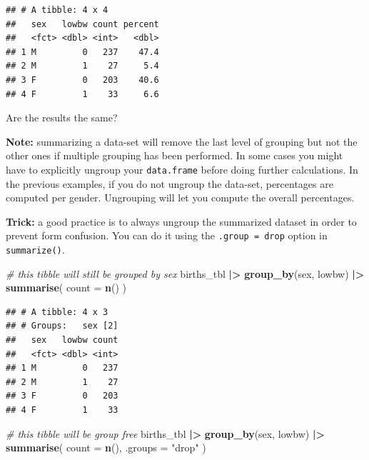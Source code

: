 \documentclass[
]{book}
\newenvironment{Shaded}{\begin{snugshade}}{\end{snugshade}}
\newcommand{\AttributeTok}[1]{\textcolor[rgb]{0.13,0.29,0.53}{#1}}
\newcommand{\CommentTok}[1]{\textcolor[rgb]{0.56,0.35,0.01}{\textit{#1}}}
\newcommand{\FunctionTok}[1]{\textcolor[rgb]{0.13,0.29,0.53}{\textbf{#1}}}
\newcommand{\NormalTok}[1]{#1}
\newcommand{\SpecialCharTok}[1]{\textcolor[rgb]{0.81,0.36,0.00}{\textbf{#1}}}
\newcommand{\StringTok}[1]{\textcolor[rgb]{0.31,0.60,0.02}{#1}}
\begin{document}
\begin{verbatim}
## # A tibble: 4 x 4
##   sex   lowbw count percent
##   <fct> <dbl> <int>   <dbl>
## 1 M         0   237    47.4
## 2 M         1    27     5.4
## 3 F         0   203    40.6
## 4 F         1    33     6.6
\end{verbatim}

Are the results the same?

\textbf{Note:} summarizing a data-set will remove the last level of grouping but not the other ones if multiple grouping has been performed. In some cases you might have to explicitly ungroup your \texttt{data.frame} before doing further calculations.
In the previous examples, if you do not ungroup the data-set, percentages are computed per gender. Ungrouping will let you compute the overall
percentages.

\textbf{Trick:} a good practice is to always ungroup the summarized dataset in order to prevent form confusion. You can do it using the \texttt{.group\ =\ \textquotesingle{}drop\textquotesingle{}} option in \texttt{summarize()}.

\begin{Shaded}
\begin{Highlighting}[]
\CommentTok{\# this tibble will still be grouped by sex}
\NormalTok{births\_tbl }\SpecialCharTok{|\textgreater{}}
  \FunctionTok{group\_by}\NormalTok{(sex, lowbw) }\SpecialCharTok{|\textgreater{}}
  \FunctionTok{summarise}\NormalTok{(}
    \AttributeTok{count =} \FunctionTok{n}\NormalTok{()}
\NormalTok{  )}
\end{Highlighting}
\end{Shaded}

\begin{verbatim}
## # A tibble: 4 x 3
## # Groups:   sex [2]
##   sex   lowbw count
##   <fct> <dbl> <int>
## 1 M         0   237
## 2 M         1    27
## 3 F         0   203
## 4 F         1    33
\end{verbatim}

\begin{Shaded}
\begin{Highlighting}[]
\CommentTok{\# this tibble will be group free}
\NormalTok{births\_tbl }\SpecialCharTok{|\textgreater{}}
  \FunctionTok{group\_by}\NormalTok{(sex, lowbw) }\SpecialCharTok{|\textgreater{}}
  \FunctionTok{summarise}\NormalTok{(}
    \AttributeTok{count =} \FunctionTok{n}\NormalTok{(),}
    \AttributeTok{.groups =} \StringTok{"drop"}
\NormalTok{  )}
\end{Highlighting}
\end{Shaded}
\end{document}
